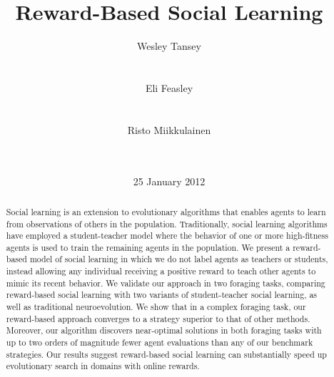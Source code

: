 \documentclass{acm_proc_article-sp}
\begin{document}
\title{Reward-Based Social Learning}

\author{
\alignauthor
Wesley Tansey\\
       \\
       \\
\alignauthor
Eli Feasley\\
       \\
       \\
\alignauthor
Risto Miikkulainen\\
       \\
       \\
}
\date{25 January 2012}

\maketitle
\begin{abstract}
Social learning is an extension to evolutionary algorithms that enables agents to learn from observations of others in the population. Traditionally, social learning algorithms have employed a student-teacher model where the behavior of one or more high-fitness agents is used to train the remaining agents in the population. We present a reward-based model of social learning in which we do not label agents as teachers or students, instead allowing any individual receiving a positive reward to teach other agents to mimic its recent behavior. We validate our approach in two foraging tasks, comparing reward-based social learning with two variants of student-teacher social learning, as well as traditional neuroevolution. We show that in a complex foraging task, our reward-based approach converges to a strategy superior to that of other methods. Moreover, our algorithm discovers near-optimal solutions in both foraging tasks with up to two orders of magnitude fewer agent evaluations than any of our benchmark strategies. Our results suggest reward-based social learning can substantially speed up evolutionary search in domains with online rewards.
\end{abstract}
\end{document}
